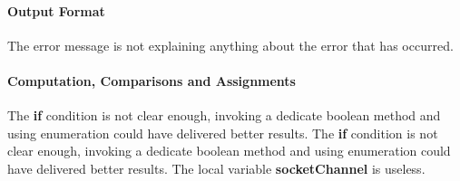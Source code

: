 \paragraph{Output Format}
\begin{itemize}
		The error message
		is not explaining anything about the error that has occurred.
\end{itemize}
%
\paragraph{Computation, Comparisons and Assignments}
\begin{itemize}
		\begin{itemize}
				The \textbf{if} condition
				is not clear enough, invoking a dedicate boolean method and using enumeration could have delivered better results.
				The \textbf{if} condition
				is not clear enough, invoking a dedicate boolean method and using enumeration could have delivered better results.
				The local variable \textbf{socketChannel}
				is useless.	
		\end{itemize}
\end{itemize}
%
